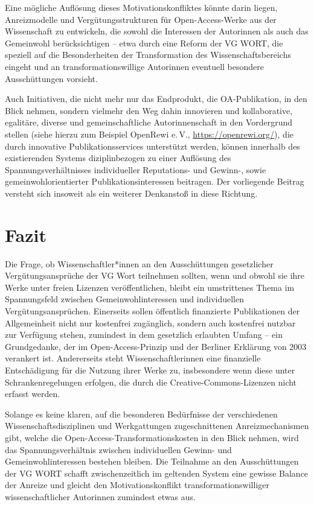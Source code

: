 \documentclass[a4paper,
fontsize=11pt,
oneside,
numbers=noperiodatend,
parskip=half-,
bibliography=totoc,
final
]{scrartcl}
\begin{document}
Eine mögliche Auflösung dieses Motivationskonfliktes könnte darin
liegen, Anreizmodelle und Vergütungsstrukturen für Open-Access-Werke aus
der Wissenschaft zu entwickeln, die sowohl die Interessen der Autorinnen
als auch das Gemeinwohl berücksichtigen -- etwa durch eine Reform der VG
WORT, die speziell auf die Besonderheiten der Transformation des
Wissenschaftsbereichs eingeht und an transformationswillige Autorinnen
eventuell besondere Ausschüttungen vorsieht.

Auch Initiativen, die nicht mehr nur das Endprodukt, die OA-Publikation,
in den Blick nehmen, sondern vielmehr den Weg dahin innovieren und
kollaborative, egalitäre, diverse und gemeinschaftliche Autorinnenschaft
in den Vordergrund stellen (siehe hierzu zum Beispiel
OpenRewi e.\,V., \url{https://openrewi.org/}), die durch innovative
Publikationsservices unterstützt werden, können innerhalb des
existierenden Systems diziplinbezogen zu einer Auflösung des
Spannungsverhältnisses individueller Reputations- und Gewinn-, sowie
gemeinwohlorientierter Publikationsinteressen beitragen. Der vorliegende
Beitrag versteht sich insoweit als ein weiterer Denkanstoß in diese
Richtung.

\section{Fazit}\label{fazit}

Die Frage, ob Wissenschaftler*innen an den Ausschüttungen gesetzlicher
Vergütungsansprüche der VG Wort teilnehmen sollten, wenn und obwohl sie
ihre Werke unter freien Lizenzen veröffentlichen, bleibt ein
umstrittenes Thema im Spannungsfeld zwischen Gemeinwohlinteressen und
individuellen Vergütungsansprüchen. Einerseits sollen öffentlich
finanzierte Publikationen der Allgemeinheit nicht nur kostenfrei
zugänglich, sondern auch kostenfrei nutzbar zur Verfügung stehen,
zumindest in dem gesetzlich erlaubten Umfang -- ein Grundgedanke, der im
Open-Access-Prinzip und der Berliner Erklärung von 2003 verankert ist.
Andererseits steht Wissenschaftlerinnen eine finanzielle Entschädigung
für die Nutzung ihrer Werke zu, insbesondere wenn diese unter
Schrankenregelungen erfolgen, die durch die Creative-Commons-Lizenzen
nicht erfasst werden.

Solange es keine klaren, auf die besonderen Bedürfnisse der
verschiedenen Wissenschaftsdisziplinen und Werkgattungen zugeschnittenen
Anreizmechanismen gibt, welche die Open-Access-Transformationskosten in
den Blick nehmen, wird das Spannungsverhältnis zwischen individuellen
Gewinn- und Gemeinwohlinteressen bestehen bleiben. Die Teilnahme an den
Ausschüttungen der VG WORT schafft zwischenzeitlich im geltenden System
eine gewisse Balance der Anreize und gleicht den Motivationskonflikt
transformationswilliger wissenschaftlicher Autorinnen zumindest etwas
aus.
\end{document}
